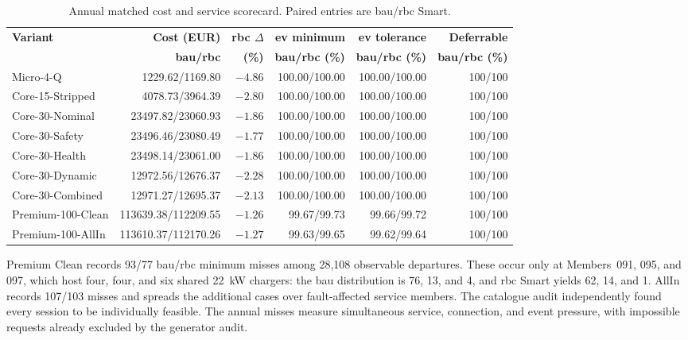 \begin{table}[htbp]
\centering
\caption{Annual matched cost and service scorecard. Paired entries are \gls{bau}/\gls{rbc} Smart.}
\label{tab:app-annual-service-scorecard}
\scriptsize
\begin{tabular}{@{}lrrrrr@{}}
\toprule
\textbf{Variant} & \textbf{Cost (EUR)} & \textbf{\gls{rbc} $\Delta$} & \textbf{\gls{ev} minimum} & \textbf{\gls{ev} tolerance} & \textbf{Deferrable} \\
 & \textbf{\gls{bau}/\gls{rbc}} & \textbf{(\%)} & \textbf{\gls{bau}/\gls{rbc} (\%)} & \textbf{\gls{bau}/\gls{rbc} (\%)} & \textbf{\gls{bau}/\gls{rbc} (\%)} \\
\midrule
Micro-4-Q & 1229.62/1169.80 & $-4.86$ & 100.00/100.00 & 100.00/100.00 & 100/100 \\
Core-15-Stripped & 4078.73/3964.39 & $-2.80$ & 100.00/100.00 & 100.00/100.00 & 100/100 \\
Core-30-Nominal & 23497.82/23060.93 & $-1.86$ & 100.00/100.00 & 100.00/100.00 & 100/100 \\
Core-30-Safety & 23496.46/23080.49 & $-1.77$ & 100.00/100.00 & 100.00/100.00 & 100/100 \\
Core-30-Health & 23498.14/23061.00 & $-1.86$ & 100.00/100.00 & 100.00/100.00 & 100/100 \\
Core-30-Dynamic & 12972.56/12676.37 & $-2.28$ & 100.00/100.00 & 100.00/100.00 & 100/100 \\
Core-30-Combined & 12971.27/12695.37 & $-2.13$ & 100.00/100.00 & 100.00/100.00 & 100/100 \\
Premium-100-Clean & 113639.38/112209.55 & $-1.26$ & 99.67/99.73 & 99.66/99.72 & 100/100 \\
Premium-100-AllIn & 113610.37/112170.26 & $-1.27$ & 99.63/99.65 & 99.62/99.64 & 100/100 \\
\bottomrule
\end{tabular}
\end{table}

Premium Clean records 93/77 \gls{bau}/\gls{rbc} minimum misses among 28,108 observable departures. These occur only at Members~091, 095, and 097, which host four, four, and six shared 22~kW chargers: the \gls{bau} distribution is 76, 13, and 4, and \gls{rbc} Smart yields 62, 14, and 1. AllIn records 107/103 misses and spreads the additional cases over fault-affected service members. The catalogue audit independently found every session to be individually feasible. The annual misses measure simultaneous service, connection, and event pressure, with impossible requests already excluded by the generator audit.


